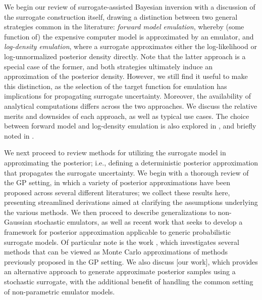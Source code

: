\documentclass[12pt]{article}
\begin{document}
We begin our review of surrogate-assisted Bayesian inversion with a discussion of the surrogate construction itself,
drawing a distinction between two general strategies common in the literature: \textit{forward model emulation}, whereby
(some function of) the expensive computer model is approximated by an emulator, and \textit{log-density emulation}, where
a surrogate approximates either the log-likelihood or log-unnormalized posterior density directly. 
Note that the latter approach is a special case of the former, and both strategies ultimately induce an 
approximation of the posterior density. However, we still find it useful to make this distinction, 
as the selection of the target function for emulation has implications for propagating surrogate uncertainty. Moreover, the 
availability of analytical computations differs across the two approaches. We discuss the relative merits and downsides of each 
approach, as well as typical use cases. The choice between forward model and log-density emulation is also explored
in \citet{StuartTeck1,GP_PDE_priors,random_fwd_models}, and briefly noted in 
\citet{Surer2023sequential,trainDynamics,ActiveLearningMCMC,emPostDens}.

We next proceed to review methods for utilizing the surrogate model in approximating the posterior; i.e., 
defining a deterministic posterior approximation that propagates the surrogate uncertainty.
We begin with a thorough 
review of the GP setting, in which a variety of posterior approximations have been proposed across several different literatures; 
we collect these results here, presenting streamlined derivations aimed at clarifying the assumptions underlying the various 
methods. We then proceed to describe generalizations to non-Gaussian stochastic emulators, as well as recent work
that seeks to develop a framework for posterior approximation applicable to generic probabilistic surrogate models.
Of particular note is the work \citet{BurknerSurrogate}, which investigates several methods that can be viewed as 
Monte Carlo approximations of methods previously proposed in the GP setting.
We also discuss [our work], which provides an alternative approach to generate approximate posterior samples using a 
stochastic surrogate, with the additional benefit of handling the common setting of non-parametric emulator models.
\end{document}
